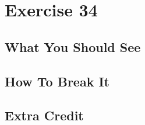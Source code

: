 \chapter{Exercise 34}


\section{What You Should See}


\section{How To Break It}


\section{Extra Credit}



